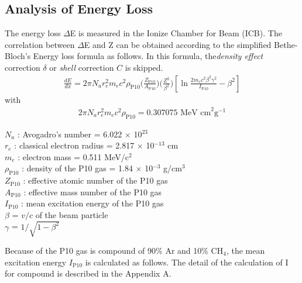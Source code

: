 \subsection{Analysis of Energy Loss}
The energy loss $\Delta$E is measured in the Ionize Chamber for Beam (ICB). The correlation between $\Delta$E and Z can be obtained according to the simplified Bethe-Bloch's Energy loss formula as follows. In this formula, the\textit{density effect} correction $\delta$ or \textit{shell} correction $C$ is skipped.
    \begin{align}
        \frac{dE}{dx} = 2\pi N_{a} r_{e}^{2} m_{e} c^{2} \rho_{\text{P10}} 
        \bigg( \frac{Z_{\text{P10}}}{A_{\text{P10}}} \bigg) \bigg( \frac{Z^{2}}{\beta^{2}} \bigg) 
        \left[ \ln \frac{2m_{e}c^{2}\beta^{2}\gamma^{2}}{I_{\text{P10}}} - \beta^{2}  \right]
    \end{align}
with
    \begin{align}
        2 \pi N_{a} r_{e}^{2} m_{e} c^{2} \rho_{\text{P10}} = 0.307075 \text{ MeV cm}^{2} \text{g}^{-1} 
    \end{align}
    \begin{adjustwidth}{1cm}{}
        $N_{a}$ : Avogadro's number = 6.022 $\times$ 10$^{23}$\\
        $r_{e}$ : classical electron radius = 2.817 $\times$ 10$^{-13}$ cm\\ 
        $m_{e}$ : electron mass = 0.511 MeV/c$^{2}$\\
        $\rho_{\text{P10}}$ : density of the P10 gas = 1.84 $\times$ 10$^{-3}$ g/cm$^{3}$\\
        $Z_{\text{P10}}$ : effective atomic number of the P10 gas\\
        $A_{\text{P10}}$ : effective mass number of the P10 gas\\
        $I_{\text{P10}}$ : mean excitation energy of the P10 gas\\ 
        $\beta$ = $v / c$ of the beam particle\\
        $\gamma$ = $1 / \sqrt{1-\beta^{2}}$
    \end{adjustwidth}
\vspace{2mm}Because of the P10 gas is compound of 90$\%$ Ar and 10$\%$ CH$_{4}$, the mean excitation energy $I_{\text{P10}}$ is calculated as follows. The detail of the calculation of I for compound is described in the Appendix A.

